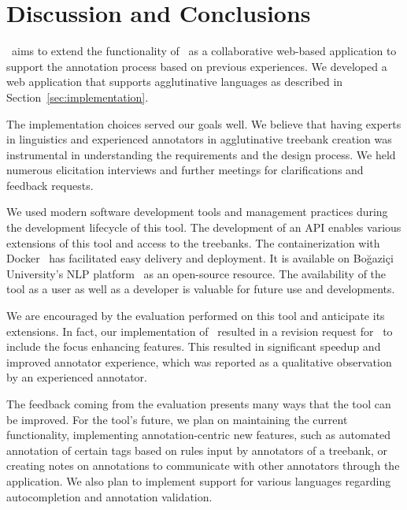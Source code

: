\section{Discussion and Conclusions}
\label{sec:discussion}

\boatvtwo\ aims to extend the functionality of \boatvone\ as a collaborative web-based application to support the annotation process based on previous experiences.
We developed a web application that supports agglutinative languages as described in Section~\ref{sec:implementation}.

The implementation choices served our goals well.
We believe that having experts in linguistics and experienced annotators in agglutinative treebank creation was instrumental in understanding the requirements and the design process.
We held numerous elicitation interviews and further meetings for clarifications and feedback requests.

We used modern software development tools and management practices during the development lifecycle of this tool.
The development of an API enables various extensions of this tool and access to the treebanks.
The containerization with Docker~\cite{docker} has facilitated easy delivery and deployment.
It is available on Boğaziçi University's NLP platform~\cite{TULAP} as an open-source resource.
The availability of the tool as a user as well as a developer is valuable for future use and developments.

We are encouraged by the evaluation performed on this tool and anticipate its extensions.
In fact, our implementation of \boatvtwo\ resulted in a revision request for \boatvone\ to include the focus enhancing features.
This resulted in significant speedup and improved annotator experience, which was reported as a qualitative observation by an experienced annotator.

The feedback coming from the evaluation presents many ways that the tool can be improved.
For the tool's future, we plan on maintaining the current functionality, implementing annotation-centric new features, such as automated annotation of certain tags based on rules input by annotators of a treebank, or creating notes on annotations to communicate with other annotators through the application.
We also plan to implement support for various languages regarding autocompletion and annotation validation.
